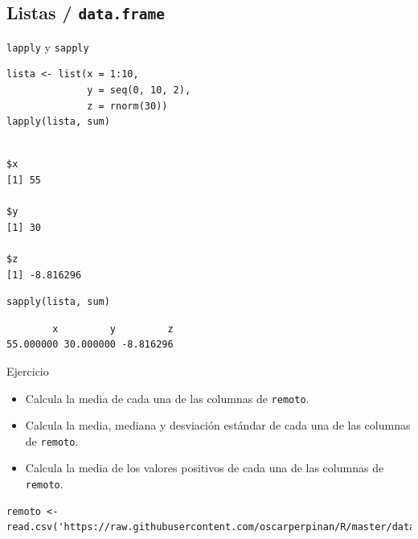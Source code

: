 \documentclass[aspectratio=169, usenames,svgnames,dvipsnames]{beamer}
\begin{document}
\subsection{Listas / \texttt{data.frame}}
\label{sec:org97ba061}
\begin{frame}[label={sec:org4a98fae},fragile]{\texttt{lapply} y \texttt{sapply}}
 \lstset{language=r,label= ,caption= ,captionpos=b,numbers=none}
\begin{lstlisting}
lista <- list(x = 1:10,
              y = seq(0, 10, 2),
              z = rnorm(30))
lapply(lista, sum)
\end{lstlisting}

\begin{verbatim}

$x
[1] 55

$y
[1] 30

$z
[1] -8.816296
\end{verbatim}


\lstset{language=r,label= ,caption= ,captionpos=b,numbers=none}
\begin{lstlisting}
sapply(lista, sum)
\end{lstlisting}

\begin{verbatim}
        x         y         z 
55.000000 30.000000 -8.816296
\end{verbatim}
\end{frame}

\begin{frame}[label={sec:org6b329af},fragile]{Ejercicio}
 \begin{block}{}
\begin{itemize}
\item Calcula la media de cada una de las columnas de \texttt{remoto}.
\item Calcula la media, mediana y desviación estándar de cada una de las columnas de \texttt{remoto}.
\item Calcula la media de los valores positivos de cada una de las columnas de \texttt{remoto}.
\end{itemize}
\end{block}

\begin{block}{}
\lstset{language=r,label= ,caption= ,captionpos=b,numbers=none}
\begin{lstlisting}
remoto <- read.csv('https://raw.githubusercontent.com/oscarperpinan/R/master/data/aranjuez.csv')
\end{lstlisting}
\end{block}
\end{frame}
\end{document}
